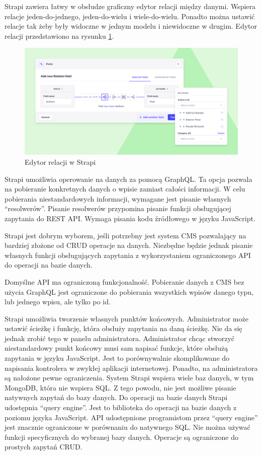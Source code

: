 Strapi zawiera łatwy w obsłudze graficzny edytor relacji między danymi. Wspiera
relacje jeden-do-jednego, jeden-do-wielu i wiele-do-wielu. Ponadto można ustawić
relacje tak żeby były widoczne w jednym modelu i niewidoczne w drugim. Edytor
relacji przedstawiono na rysunku \ref{strapiRelationsEditor}.

\begin{figure}[h]
    \centering
    \includegraphics[width=1\textwidth]{./img/strapi_relations_editor.png}
    \caption{Edytor relacji w Strapi}
    \label{strapiRelationsEditor}
\end{figure}

Strapi umożliwia operowanie na danych za pomocą GraphQL. Ta opcja pozwala na
pobieranie konkretnych danych o wpisie zamiast całości informacji. W celu
pobierania niestandardowych informacji, wymagane jest pisanie własnych
``resolwerów''. Pisanie resolwerów przypomina pisanie funkcji obsługującej
zapytania do REST API. Wymaga pisania kodu źródłowego w języku JavaScript.

Strapi jest dobrym wyborem, jeśli potrzebny jest system CMS
pozwalający na bardziej złożone od CRUD operacje na danych. Niezbędne będzie
jednak pisanie własnych funkcji obsługujących zapytania z wykorzystaniem
ograniczonego API do operacji na bazie danych.

Domyślne API ma ograniczoną funkcjonalność. Pobieranie danych z CMS bez użycia
GraphQL jest ograniczone do pobierania wszystkich wpisów danego typu, lub
jednego wpisu, ale tylko po id.

Strapi umożliwia tworzenie własnych punktów końcowych. Administrator może ustawić
ścieżkę i funkcję, która obsłuży zapytania na daną ścieżkę. Nie da się jednak
zrobić tego w panelu administratora. Administrator chcąc stworzyć niestandardowy
punkt końcowy musi sam napisać funkcje, które obsłużą zapytania w języku
JavaScript. Jest to porównywalnie skomplikowane do napisania kontrolera w
zwykłej aplikacji internetowej. Ponadto, na administratora są nałożone pewne
ograniczenia. System Strapi wspiera wiele baz danych, w tym MongoDB, która nie
wspiera SQL. Z tego powodu, nie jest możliwe pisanie natywnych zapytań do bazy
danych. Do operacji na bazie danych Strapi udostępnia ``query engine''. Jest to
biblioteka do operacji na bazie danych z poziomu języka JavaScript. API
udostępnione programistom przez ``query engine'' jest znacznie ograniczone w
porównaniu do natywnego SQL. Nie można używać funkcji specyficznych do wybranej
bazy danych. Operacje są ograniczone do prostych zapytań CRUD.

